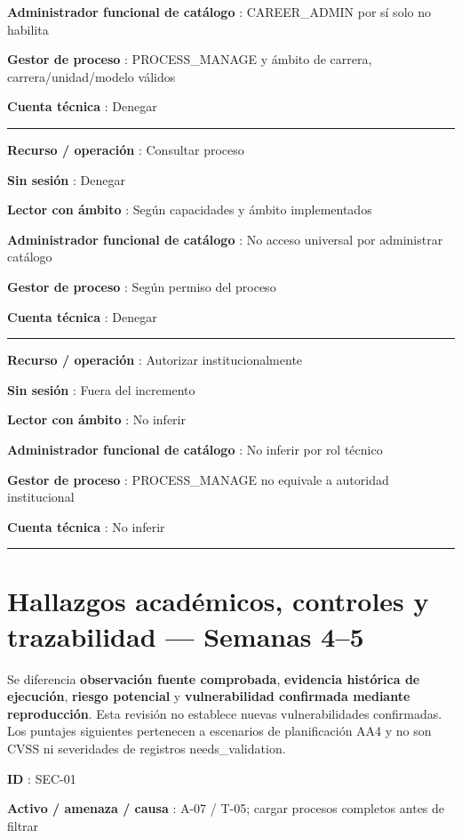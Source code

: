 \documentclass[12pt,a4paper]{report}
\begin{document}
\textbf{Administrador funcional de catálogo }: CAREER\_ADMIN por sí solo
no habilita

\textbf{Gestor de proceso }: PROCESS\_MANAGE y ámbito de carrera,
carrera/unidad/modelo válidos

\textbf{Cuenta técnica }: Denegar

\medskip\hrule\medskip

\textbf{Recurso / operación }: Consultar proceso

\textbf{Sin sesión }: Denegar

\textbf{Lector con ámbito }: Según capacidades y ámbito implementados

\textbf{Administrador funcional de catálogo }: No acceso universal por
administrar catálogo

\textbf{Gestor de proceso }: Según permiso del proceso

\textbf{Cuenta técnica }: Denegar

\medskip\hrule\medskip

\textbf{Recurso / operación }: Autorizar institucionalmente

\textbf{Sin sesión }: Fuera del incremento

\textbf{Lector con ámbito }: No inferir

\textbf{Administrador funcional de catálogo }: No inferir por rol
técnico

\textbf{Gestor de proceso }: PROCESS\_MANAGE no equivale a autoridad
institucional

\textbf{Cuenta técnica }: No inferir

\medskip\hrule\medskip

\chapter{Hallazgos académicos, controles y trazabilidad --- Semanas
4--5}\label{AA4-semana-4-anexo1-hallazgos-acaduxe9micos-controles-y-trazabilidad--semanas-45}

Se diferencia \textbf{observación fuente comprobada}, \textbf{evidencia
histórica de ejecución}, \textbf{riesgo potencial} y
\textbf{vulnerabilidad confirmada mediante reproducción}. Esta revisión
no establece nuevas vulnerabilidades confirmadas. Los puntajes
siguientes pertenecen a escenarios de planificación AA4 y no son CVSS ni
severidades de registros needs\_validation.

\textbf{ID }: SEC-01

\textbf{Activo / amenaza / causa }: A-07 / T-05; cargar procesos
completos antes de filtrar
\end{document}
